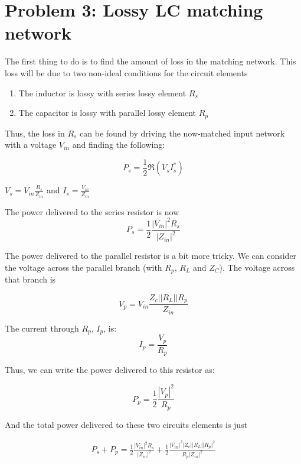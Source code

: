 \section*{Problem 3: Lossy LC matching network}
\addtocounter{section}{1}
\setcounter{equation}{0}
The first thing to do is to find the amount of loss in the matching network.
This loss will be due to two non-ideal conditions for the circuit elements
\begin{enumerate}
    \item The inductor is lossy with series lossy element $R_s$
    \item The capacitor is lossy with parallel lossy element $R_p$
\end{enumerate}

Thus, the loss in $R_s$ can be found by driving the now-matched input network
with a voltage $V_{in}$ and finding the following:

\[ 
        P_{s} = \frac{1}{2} \Re \left( V_{s} I_s^* \right) 
\]

$V_s = V_{in} \frac{R_s}{Z_{in}}$ and $I_s = \frac{V_{in}}{Z_{in}}$ 

The power delivered to the series resistor is now 
\[ 
    P_s = \frac{1}{2} \frac{\left|V_{in}\right|^2 R_s}{\left|Z_{in}\right|^2}
\]

The power delivered to the parallel resistor is a bit more tricky. We can
consider the voltage across the parallel branch (with $R_p$, $R_L$ and $Z_C$).
The voltage across that branch is 

\[ 
        V_p = V_{in} \frac{Z_c||R_L||R_p}{Z_{in}}
\]

The current through $R_p$, $I_p$, is:
\[ 
    I_p = \frac{V_p}{R_p} 
\]

Thus, we can write the power delivered to this resistor as:

\[ 
    P_p = \frac{1}{2}  \frac{\left|V_p \right|^2 }{R_p}
\]

And the total power delivered to these two circuits elements is just

\begin{align}
    P_s + P_p = \frac{1}{2} \frac{\left| V_{in} \right|^2 R_s}{\left| Z_{in}
    \right|^2} + \frac{1}{2} \frac{\left| V_{in} \right|^2 \Big|
Z_c||R_L||R_p \Big|^2}{R_p\left| Z_{in} \right|^2}
\end{align}



